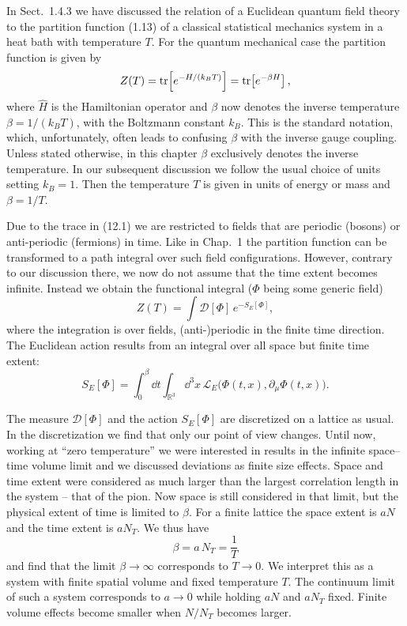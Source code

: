 In Sect.~1.4.3 we have discussed the relation of a Euclidean quantum field
theory to the partition function (1.13) of a classical statistical mechanics
system in a heat bath with temperature $T$. For the quantum mechanical case the
partition function is given by
\begin{equation}
  Z(T) = \operatorname{tr}\!\left[e^{-H/(k_B T)}\right] = \operatorname{tr}\!\left[e^{-\beta H}\right],
\end{equation}
where $\hat{H}$ is the Hamiltonian operator and $\beta$ now denotes the inverse
temperature $\beta = 1/(k_B T)$, with the Boltzmann constant $k_B$. This is the
standard notation, which, unfortunately, often leads to confusing $\beta$ with
the inverse gauge coupling. Unless stated otherwise, in this chapter $\beta$
exclusively denotes the inverse temperature. In our subsequent discussion we
follow the usual choice of units setting $k_B = 1$. Then the temperature $T$ is
given in units of energy or mass and $\beta = 1/T$.

Due to the trace in (12.1) we are restricted to fields that are periodic
(bosons) or anti-periodic (fermions) in time. Like in Chap.~1 the partition
function can be transformed to a path integral over such field configurations.
However, contrary to our discussion there, we now do not assume that the time
extent becomes infinite. Instead we obtain the functional integral ($\Phi$
being some generic field)
\begin{equation}
  Z(T) = \int \mathcal{D}[\Phi]\,e^{-S_E[\Phi]},
\end{equation}
where the integration is over fields, (anti-)periodic in the finite time
direction. The Euclidean action results from an integral over all space but
finite time extent:
\begin{equation}
  S_E[\Phi] = \int_0^{\beta}\!\dd t \int_{\mathbb{R}^3}\!\dd^3 x\,
    \mathcal{L}_E\big(\Phi(t,x),\partial_\mu\Phi(t,x)\big).
\end{equation}

The measure $\mathcal{D}[\Phi]$ and the action $S_E[\Phi]$ are discretized on a
lattice as usual. In the discretization we find that only our point of view
changes. Until now, working at ``zero temperature'' we were interested in
results in the infinite space--time volume limit and we discussed deviations as
finite size effects. Space and time extent were considered as much larger than
the largest correlation length in the system -- that of the pion. Now space is
still considered in that limit, but the physical extent of time is limited to
$\beta$. For a finite lattice the space extent is $aN$ and the time extent is
$aN_T$. We thus have
\begin{equation}
  \beta = a\,N_T = \frac{1}{T}
\end{equation}
and find that the limit $\beta\to\infty$ corresponds to $T\to 0$. We interpret
this as a system with finite spatial volume and fixed temperature $T$. The
continuum limit of such a system corresponds to $a\to 0$ while holding $aN$ and
$aN_T$ fixed. Finite volume effects become smaller when $N/N_T$ becomes larger.

